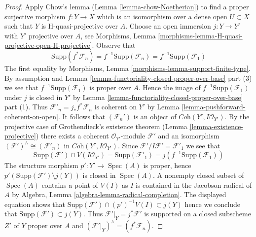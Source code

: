 \documentclass[10pt,a4paper]{amsart}
\theoremstyle{plain}
\theoremstyle{definition}
\theoremstyle{remark}
\numberwithin{equation}{subsection}
\def\Spec{\mathop{\mathrm{Spec}}}
\begin{document}
\begin{proof}
\medskip\noindent
Apply Chow's lemma (Lemma \ref{lemma-chow-Noetherian}) to find a
proper surjective morphism $f : Y \to X$ which is an isomorphism
over a dense open $U \subset X$ such that $Y$ is H-quasi-projective
over $A$. Choose an open immersion $j : Y \to Y'$ with
$Y'$ projective over $A$, see
Morphisms, Lemma \ref{morphisms-lemma-H-quasi-projective-open-H-projective}.
Observe that
$$
\text{Supp}(f^*\mathcal{F}_n) = f^{-1}\text{Supp}(\mathcal{F}_n) =
f^{-1}\text{Supp}(\mathcal{F}_1)
$$
The first equality by
Morphisms, Lemma \ref{morphisms-lemma-support-finite-type}.
By assumption and
Lemma \ref{lemma-functoriality-closed-proper-over-base} part (3)
we see that $f^{-1}\text{Supp}(\mathcal{F}_1)$ is proper over $A$.
Hence the image of $f^{-1}\text{Supp}(\mathcal{F}_1)$
under $j$ is closed in $Y'$ by
Lemma \ref{lemma-functoriality-closed-proper-over-base} part (1).
Thus $\mathcal{F}'_n = j_*f^*\mathcal{F}_n$ is coherent on
$Y'$ by Lemma \ref{lemma-pushforward-coherent-on-open}.
It follows that $(\mathcal{F}_n')$
is an object of $\textit{Coh}(Y', I\mathcal{O}_{Y'})$.
By the projective case of Grothendieck's existence theorem
(Lemma \ref{lemma-existence-projective})
there exists a coherent $\mathcal{O}_{Y'}$-module
$\mathcal{F}'$ and an isomorphism
$(\mathcal{F}')^\wedge \cong (\mathcal{F}'_n)$ in
$\textit{Coh}(Y', I\mathcal{O}_{Y'})$.
Since $\mathcal{F}'/I\mathcal{F}' = \mathcal{F}'_1$ we see that
$$
\text{Supp}(\mathcal{F}') \cap V(I\mathcal{O}_{Y'}) =
\text{Supp}(\mathcal{F}'_1) = j(f^{-1}\text{Supp}(\mathcal{F}_1))
$$
The structure morphism $p' : Y' \to \Spec(A)$ is proper, hence
$p'(\text{Supp}(\mathcal{F}') \setminus j(Y))$
is closed in $\Spec(A)$. A nonempty closed subset of $\Spec(A)$
contains a point of $V(I)$ as $I$ is contained in the Jacobson radical
of $A$ by Algebra, Lemma \ref{algebra-lemma-radical-completion}.
The displayed equation shows that
$\text{Supp}(\mathcal{F}') \cap (p')^{-1}V(I) \subset j(Y)$
hence we conclude that $\text{Supp}(\mathcal{F}') \subset j(Y)$.
Thus $\mathcal{F}'|_Y = j^*\mathcal{F}'$
is supported on a closed subscheme $Z'$ of $Y$ proper over $A$
and $(\mathcal{F}'|_Y)^\wedge = (f^*\mathcal{F}_n)$.


\end{proof}
\end{document}

